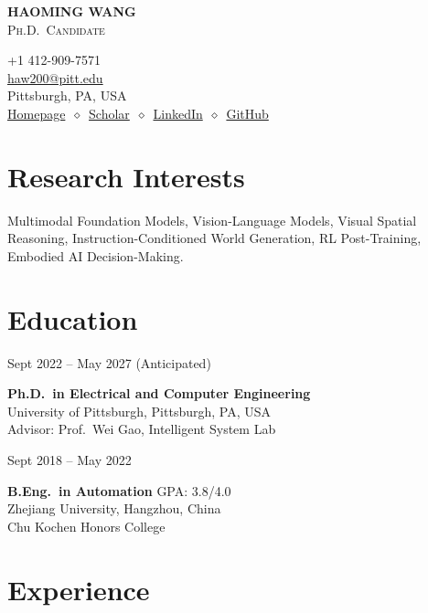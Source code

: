\documentclass[11pt, letterpaper]{article}
\newenvironment{datedentry}[1]{%
  \par\noindent
  \begin{minipage}[t]{2.8cm}\raggedright\small #1\end{minipage}%
  \hspace{0.3cm}%
  \begin{minipage}[t]{\dimexpr\linewidth-3.1cm\relax}\raggedright
}{\end{minipage}\par\medskip}
\begin{document}
\noindent
\begin{minipage}[t]{0.58\linewidth}
  \vspace{0pt}
  {\fontsize{24pt}{26pt}\selectfont \textbf{HAOMING WANG}}\\[2pt]
  {\scshape\normalsize Ph.D.\ Candidate}
\end{minipage}%
\begin{minipage}[t]{0.42\linewidth}
  \vspace{0pt}
  \raggedleft\small
  +1 412-909-7571 \\
  \href{mailto:haw200@pitt.edu}{haw200@pitt.edu} \\
  Pittsburgh, PA, USA \\[2pt]
  \href{https://haomingwang645.github.io/}{Homepage}\ $\diamond$\ \href{https://scholar.google.com.hk/citations?user=bf6LCjUAAAAJ}{Scholar}\ $\diamond$\ \href{https://www.linkedin.com/in/haoming-wang-40a6a7239/}{LinkedIn}\ $\diamond$\ \href{https://github.com/HaomingWang645}{GitHub}
\end{minipage}

\section{Research Interests}
Multimodal Foundation Models, Vision-Language Models, Visual Spatial Reasoning, Instruction-Conditioned World Generation, RL Post-Training, Embodied AI Decision-Making.

\section{Education}

\begin{datedentry}{Sept 2022 -- May 2027 (Anticipated)}
\textbf{Ph.D.\ in Electrical and Computer Engineering}\\
University of Pittsburgh, Pittsburgh, PA, USA\\
Advisor: Prof.\ Wei Gao, Intelligent System Lab
\end{datedentry}

\begin{datedentry}{Sept 2018 -- May 2022}
\textbf{B.Eng.\ in Automation} \hfill GPA: 3.8/4.0\\
Zhejiang University, Hangzhou, China\\
Chu Kochen Honors College
\end{datedentry}

\section{Experience}
\end{document}
